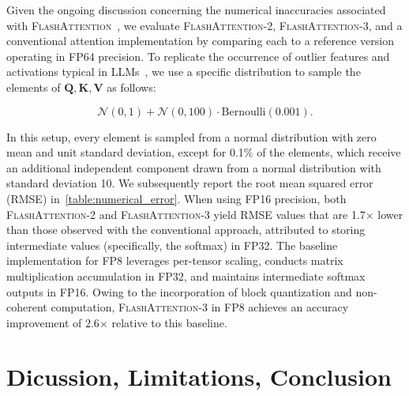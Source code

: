 \begin{itemize}
Given the ongoing discussion concerning the numerical inaccuracies associated with \textsc{FlashAttention}~\citep{golden2024flash}, we evaluate \textsc{FlashAttention-2}, \textsc{FlashAttention-3}, and a conventional attention implementation by comparing each to a reference version operating in FP64 precision. To replicate the occurrence of outlier features and activations typical in LLMs~\citep{dettmers2208llm,
  sun2024massive}, we use a specific distribution to sample the elements of $\mathbf{Q}, \mathbf{K}, \mathbf{V}$ as follows:

\begin{equation*}
  \mathcal{N}(0, 1) + \mathcal{N}(0, 100) \cdot \mathrm{Bernoulli}(0.001).
\end{equation*}

In this setup, every element is sampled from a normal distribution with zero mean and unit standard deviation, except for 0.1\% of the elements, which receive an additional independent component drawn from a normal distribution with standard deviation 10. We subsequently report the root mean squared error (RMSE) in~\cref{table:numerical_error}. When using FP16 precision, both \textsc{FlashAttention-2} and \textsc{FlashAttention-3} yield RMSE values that are 1.7$\times$ lower than those observed with the conventional approach, attributed to storing intermediate values (specifically, the softmax) in FP32. The baseline implementation for FP8 leverages per-tensor scaling, conducts matrix multiplication accumulation in FP32, and maintains intermediate softmax outputs in FP16. Owing to the incorporation of block quantization and non-coherent computation, \textsc{FlashAttention-3} in FP8 achieves an accuracy improvement of 2.6$\times$ relative to this baseline.

\section{Dicussion, Limitations, Conclusion}
\label{sec:discussion}


\end{itemize}
